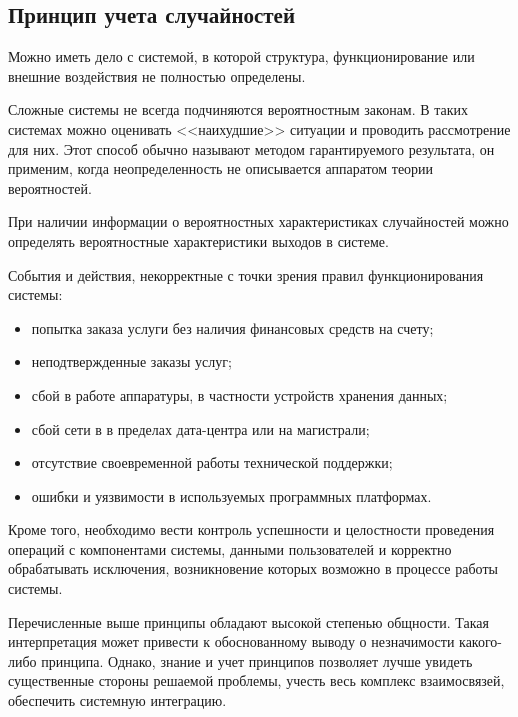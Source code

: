 \subsection{Принцип учета случайностей}

Можно иметь дело с системой, в которой структура, функционирование или внешние воздействия не полностью определены.

Сложные системы не всегда подчиняются вероятностным законам.
В таких системах можно оценивать <<наихудшие>> ситуации и проводить рассмотрение для них.
Этот способ обычно называют методом гарантируемого результата, он применим, когда неопределенность не описывается аппаратом теории вероятностей.

При наличии информации о вероятностных характеристиках случайностей можно определять вероятностные характеристики выходов в системе.

События и действия, некорректные с точки зрения правил функционирования системы:
\begin{itemize}
  \item попытка заказа услуги без наличия финансовых средств на счету;
  \item неподтвержденные заказы услуг;
  \item сбой в работе аппаратуры, в частности устройств хранения данных;
  \item сбой сети в в пределах дата-центра или на магистрали;
  \item отсутствие своевременной работы технической поддержки;
  \item ошибки и уязвимости в используемых программных платформах.
\end{itemize}

Кроме того, необходимо вести контроль успешности и целостности проведения операций с компонентами системы, данными пользователей и корректно обрабатывать исключения, возникновение которых возможно в процессе работы системы.

Перечисленные выше принципы обладают высокой степенью общности.
Такая интерпретация может привести к обоснованному выводу о незначимости какого-либо принципа.
Однако, знание и учет принципов позволяет лучше увидеть существенные стороны решаемой проблемы, учесть весь комплекс взаимосвязей, обеспечить системную интеграцию.

\clearpage
